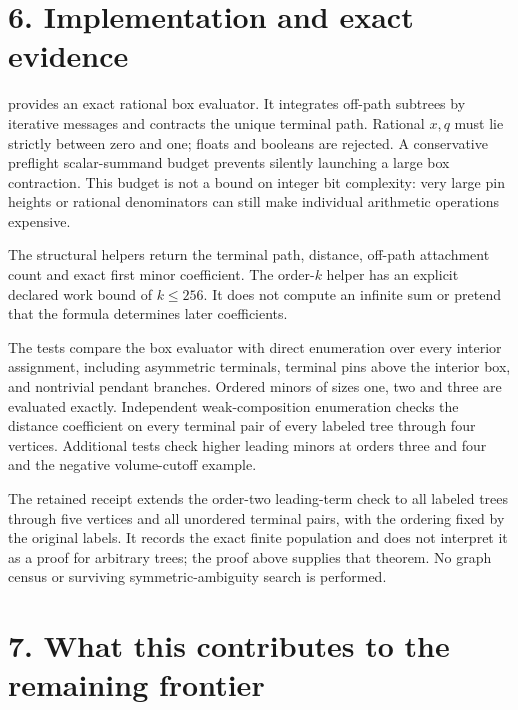 \documentclass[
  11pt,
  a4paper,
]{report}
\let\singularitytexttt\texttt
\renewcommand{\texttt}[1]{\singularitytexttt{\seqsplit{#1}}}
\begin{document}
\hypertarget{implementation-and-exact-evidence}{%
\section{6. Implementation and exact
evidence}\label{implementation-and-exact-evidence}}

\texttt{src/singularity/tree\_positivity.py} provides an exact rational
box evaluator. It integrates off-path subtrees by iterative messages and
contracts the unique terminal path. Rational \(x,q\) must lie strictly
between zero and one; floats and booleans are rejected. A conservative
preflight scalar-summand budget prevents silently launching a large box
contraction. This budget is not a bound on integer bit complexity: very
large pin heights or rational denominators can still make individual
arithmetic operations expensive.

The structural helpers return the terminal path, distance, off-path
attachment count and exact first minor coefficient. The order-\(k\)
helper has an explicit declared work bound of \(k\le256\). It does not
compute an infinite sum or pretend that the formula determines later
coefficients.

The tests compare the box evaluator with direct enumeration over every
interior assignment, including asymmetric terminals, terminal pins above
the interior box, and nontrivial pendant branches. Ordered minors of
sizes one, two and three are evaluated exactly. Independent
weak-composition enumeration checks the distance coefficient on every
terminal pair of every labeled tree through four vertices. Additional
tests check higher leading minors at orders three and four and the
negative volume-cutoff example.

The retained receipt extends the order-two leading-term check to all
labeled trees through five vertices and all unordered terminal pairs,
with the ordering fixed by the original labels. It records the exact
finite population and does not interpret it as a proof for arbitrary
trees; the proof above supplies that theorem. No graph census or
surviving symmetric-ambiguity search is performed.

\hypertarget{what-this-contributes-to-the-remaining-frontier}{%
\section{7. What this contributes to the remaining
frontier}\label{what-this-contributes-to-the-remaining-frontier}}
\end{document}
